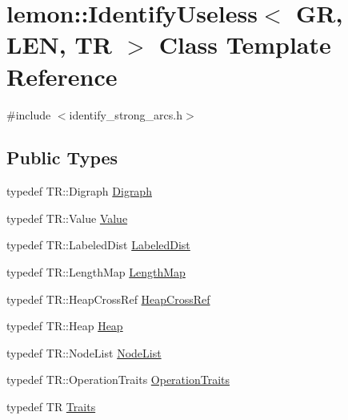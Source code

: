 \hypertarget{classlemon_1_1_identify_useless}{}\section{lemon\+:\+:Identify\+Useless$<$ GR, L\+EN, TR $>$ Class Template Reference}
\label{classlemon_1_1_identify_useless}


{\ttfamily \#include $<$identify\+\_\+strong\+\_\+arcs.\+h$>$}

\subsection*{Public Types}
\begin{DoxyCompactItemize}
\item 
typedef T\+R\+::\+Digraph \hyperlink{classlemon_1_1_identify_useless_a68c5b16f64c42ef8d89c3d4c467aad06}{Digraph}
\item 
typedef T\+R\+::\+Value \hyperlink{classlemon_1_1_identify_useless_af6901305bc21b76ae676c554b4acb672}{Value}
\item 
typedef T\+R\+::\+Labeled\+Dist \hyperlink{classlemon_1_1_identify_useless_ad44b00c430e4b58280c0399b4a02de4d}{Labeled\+Dist}
\item 
typedef T\+R\+::\+Length\+Map \hyperlink{classlemon_1_1_identify_useless_a47fb50fbfa981adae466fc6e71436fee}{Length\+Map}
\item 
typedef T\+R\+::\+Heap\+Cross\+Ref \hyperlink{classlemon_1_1_identify_useless_a8028f36ab31388d786049d08dfce2453}{Heap\+Cross\+Ref}
\item 
typedef T\+R\+::\+Heap \hyperlink{classlemon_1_1_identify_useless_af836320346e1d014d8bfe6d9e17400ac}{Heap}
\item 
typedef T\+R\+::\+Node\+List \hyperlink{classlemon_1_1_identify_useless_a9de719ca7cb13d499ff99c728d4ec16e}{Node\+List}
\item 
typedef T\+R\+::\+Operation\+Traits \hyperlink{classlemon_1_1_identify_useless_ad9bc590b20f0a2dc6f9bd28eea1f6ba4}{Operation\+Traits}
\item 
typedef TR \hyperlink{classlemon_1_1_identify_useless_a966f0494a37669191b1ce31fc9362e91}{Traits}
\end{DoxyCompactItemize}
